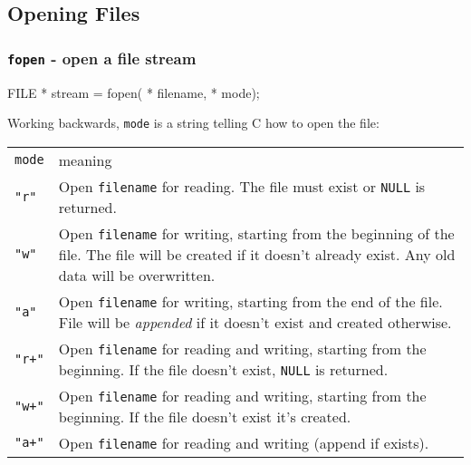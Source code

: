 \documentclass[smaller,table]{beamer} %
\begin{document}
\subsection{Opening Files}
\begin{frame}
\frametitle{{\tt fopen} - open a file stream}
\begin{semiverbatim}
\small
FILE * stream = fopen( * filename,  * mode);
\end{semiverbatim}

Working backwards, {\tt mode} is a string telling C how to open the file:
{\footnotesize
\begin{center}
\begin{tabular}{l p{250pt}}
\tt mode& meaning\\
\tt "r"& Open {\tt filename} for reading. The file must exist or {\tt NULL} is returned.\\
\tt "w"& Open {\tt filename} for writing, starting from the beginning of the file. The file will be created if it doesn't already exist. Any old data will be overwritten.\\
\tt "a"& Open {\tt filename} for writing, starting from the end of the file. File will be \emph{appended} if it doesn't exist and created otherwise.\\
\tt "r+"& Open {\tt filename} for reading and writing, starting from the beginning. If the file doesn't exist, {\tt NULL} is returned.\\
\tt "w+"& Open {\tt filename} for reading and writing, starting from the beginning. If the file doesn't exist it's created.\\
\tt "a+"& Open {\tt filename} for reading and writing (append if exists).
\end{tabular}
\end{center}}
\end{frame}
\end{document}
